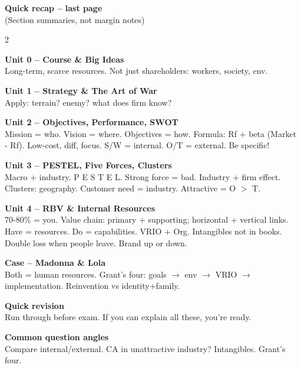 \documentclass[8pt,landscape,a4paper]{article}
\begin{document}
\newpage
\vspace*{0.3em}
\begin{center}
\textbf{\color{eublue}Quick recap -- last page}\\[0.3em]
\small\textcolor{notegrey}{(Section summaries, not margin notes)}
\end{center}
\vspace{0.4em}
\noindent\color{notegrey}
\setlength{\parskip}{0.3em}
\begin{multicols}{2}

\textbf{Unit 0 -- Course \& Big Ideas}\\
Long-term, scarce resources. Not just shareholders: workers, society, env.

\textbf{Unit 1 -- Strategy \& The Art of War}\\
Apply: terrain? enemy? what does firm know?

\textbf{Unit 2 -- Objectives, Performance, SWOT}\\
Mission = who. Vision = where. Objectives = how. Formula: Rf + beta (Market - Rf). Low-cost, diff, focus. S/W = internal. O/T = external. Be specific!

\textbf{Unit 3 -- PESTEL, Five Forces, Clusters}\\
Macro + industry. P E S T E L. Strong force = bad. Industry + firm effect. Clusters: geography. Customer need = industry. Attractive = O $>$ T.

\textbf{Unit 4 -- RBV \& Internal Resources}\\
70-80\% = you. Value chain: primary + supporting; horizontal + vertical links. Have = resources. Do = capabilities. VRIO + Org. Intangibles not in books. Double loss when people leave. Brand up or down.

\textbf{Case -- Madonna \& Lola}\\
Both = human resources. Grant's four: goals $\to$ env $\to$ VRIO $\to$ implementation. Reinvention vs identity+family.

\textbf{Quick revision}\\
Run through before exam. If you can explain all these, you're ready.

\textbf{Common question angles}\\
Compare internal/external. CA in unattractive industry? Intangibles. Grant's four.

\end{multicols}
\vfill
\normalsize\normalfont\color{black}
\end{document}
